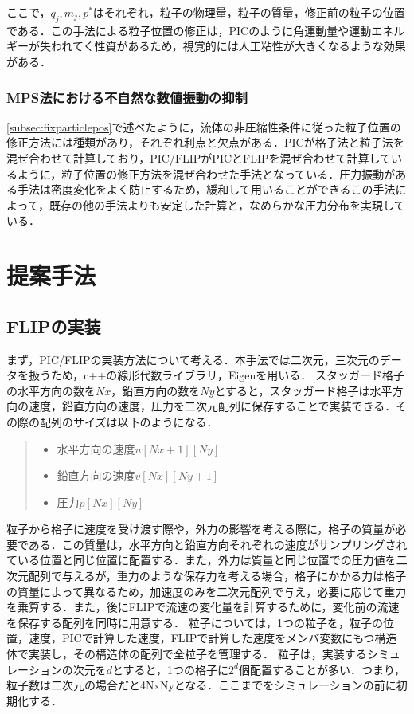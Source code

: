 \documentclass[a4j,12pt]{jreport}
\begin{document}
ここで，$q_j,m_j,p^*$はそれぞれ，粒子の物理量，粒子の質量，修正前の粒子の位置である．この手法による粒子位置の修正は，PICのように角運動量や運動エネルギーが失われてく性質があるため，視覚的には人工粘性が大きくなるような効果がある．
\subsection{MPS法における不自然な数値振動の抑制}\label{subsec:japan}
\ref{subsec:fixparticlepos}で述べたように，流体の非圧縮性条件に従った粒子位置の修正方法には種類があり，それぞれ利点と欠点がある．PICが格子法と粒子法を混ぜ合わせて計算しており，PIC/FLIPがPICとFLIPを混ぜ合わせて計算しているように，粒子位置の修正方法を混ぜ合わせた手法となっている．圧力振動がある手法は密度変化をよく防止するため，緩和して用いることができるこの手法によって，既存の他の手法よりも安定した計算と，なめらかな圧力分布を実現している．
\chapter{提案手法} \label{chapter:4}
\section{FLIPの実装} \label{sec:ImpFLIP}
まず，PIC/FLIPの実装方法について考える．本手法では二次元，三次元のデータを扱うため，c++の線形代数ライブラリ，Eigenを用いる．
スタッガード格子の水平方向の数を$Nx$，鉛直方向の数を$Ny$とすると，スタッガード格子は水平方向の速度，鉛直方向の速度，圧力を二次元配列に保存することで実装できる．その際の配列のサイズは以下のようになる．
\begin{quote}
	\begin{itemize}
		\item $水平方向の速度 u[Nx+1][Ny]$ 
		\item $鉛直方向の速度 v[Nx][Ny+1]$ 
		\item $圧力 p[Nx][Ny]$
	\end{itemize}
\end{quote}
粒子から格子に速度を受け渡す際や，外力の影響を考える際に，格子の質量が必要である．この質量は，水平方向と鉛直方向それぞれの速度がサンプリングされている位置と同じ位置に配置する．また，外力は質量と同じ位置での圧力値を二次元配列で与えるが，重力のような保存力を考える場合，格子にかかる力は格子の質量によって異なるため，加速度のみを二次元配列で与え，必要に応じて重力を乗算する．また，後にFLIPで流速の変化量を計算するために，変化前の流速を保存する配列を同時に用意する．
粒子については，1つの粒子を，粒子の位置，速度，PICで計算した速度，FLIPで計算した速度をメンバ変数にもつ構造体で実装し，その構造体の配列で全粒子を管理する．
粒子は，実装するシミュレーションの次元を$d$とすると，1つの格子に$2^d$個配置することが多い．つまり，粒子数は二次元の場合だと4NxNyとなる．ここまでをシミュレーションの前に初期化する．
\end{document}
